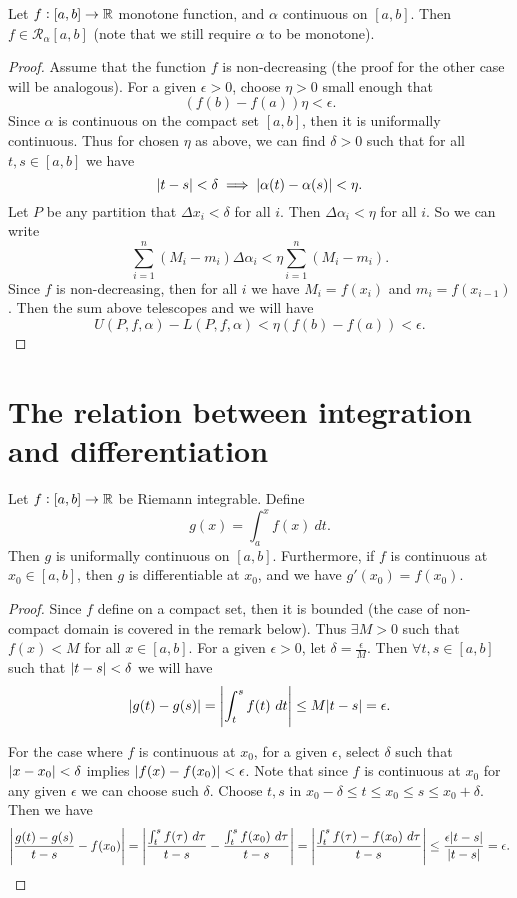 \begin{proposition}
	Let $f:[a,b] \to \mathbb{R}$ monotone function, and $\alpha$ continuous on $[a,b]$. Then $f \in \mathcal{R}_\alpha[a,b]$ (note that we still require $\alpha$ to be monotone). 
\end{proposition}
\begin{proof}
	Assume that the function $f$ is non-decreasing (the proof for the other case will be analogous). For a given $\epsilon>0$, choose $\eta>0$ small enough that
	\[ (f(b) - f(a))\eta < \epsilon. \]
	Since $\alpha$ is continuous on the compact set $[a,b]$, then it is uniformally continuous. Thus for chosen $\eta$ as above, we can find $\delta>0$ such that for all $t,s \in [a,b]$ we have
	\[ |t-s| < \delta \implies |\alpha(t) - \alpha(s)| < \eta. \]
	Let $P$ be any partition that $\Delta x_i < \delta$ for all $i$. Then $\Delta \alpha_i < \eta$ for all $i$. So we can write
	\[ \sum_{i=1}^{n} (M_i - m_i)\Delta\alpha_i < \eta \sum_{i=1}^{n} (M_i - m_i). \]
	Since $f$ is non-decreasing, then for all $i$ we have $M_i = f(x_i)$ and $m_i = f(x_{i-1})$. Then the sum above telescopes and we will have
	\[ U(P,f,\alpha) - L(P,f,\alpha) < \eta (f(b) - f(a)) < \epsilon. \]
\end{proof}


\section{The relation between integration and differentiation}


\begin{proposition}
	Let $ f:[a,b] \to \mathbb{R} $ be Riemann integrable. Define
	\[ g(x) = \int_{a}^{x} f(x) \ dt. \]
	Then $ g $ is uniformally continuous on $ [a,b] $. Furthermore, if $ f $ is continuous at $ x_0 \in [a,b] $, then $ g $ is differentiable at $ x_0 $, and we have $ g'(x_0) = f(x_0) $.
\end{proposition}
\begin{proof}
	Since $ f $ define on a compact set, then it is bounded (the case of non-compact domain is covered in the remark below). Thus $ \exists M > 0 $ such that $ f(x) < M $ for all $  x\in [a,b]$. For a given $ \epsilon >0 $, let $ \delta = \frac{\epsilon}{M} $. Then $ \forall t,s \in [a,b] $ such that $ |t-s|<\delta $ we will have
	\[ |g(t) - g(s)| = \left|\int_{t}^{s} f(t)\ dt\right| \leq M |t-s| = \epsilon. \]
	
	For the case where $ f $ is continuous at $ x_0 $, for a given $ \epsilon $, select $ \delta $ such that $ |x-x_0| < \delta  $ implies $ |f(x) - f(x_0)| < \epsilon$. Note that since $ f $ is continuous at $ x_0 $ for any given $ \epsilon $ we can choose such $ \delta $. Choose $ t,s $ in $ x_0 - \delta \leq t \leq x_0 \leq s \leq x_0 + \delta $. Then we have
	\[ \left|\frac{g(t) - g(s)}{t-s} - f(x_0)\right| = \left|\frac{\int_{t}^{s} f(\tau) \ d\tau }{t-s} - \frac{\int_{t}^{s} f(x_0) \ d\tau}{t-s}\right| = \left|\frac{\int_{t}^{s} f(\tau) - f(x_0) \ d\tau}{t-s}\right| \leq \frac{\epsilon |t-s|}{|t-s|} = \epsilon. \]
\end{proof}

